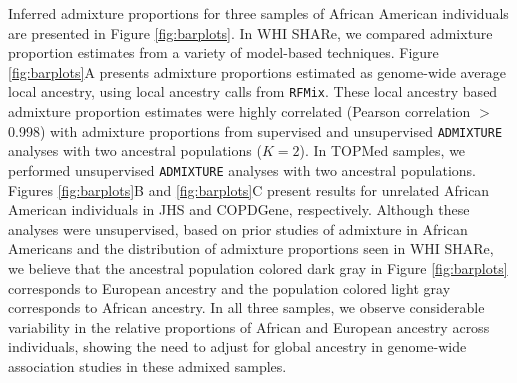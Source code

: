 \documentclass[12pt]{article}
\begin{document}
Inferred admixture proportions for three samples of African American individuals are presented in Figure \ref{fig:barplots}. 
In WHI SHARe, we compared admixture proportion estimates from a variety of model-based techniques. 
Figure \ref{fig:barplots}A presents admixture proportions estimated as genome-wide average local ancestry, using local ancestry calls from \texttt{RFMix}. 
These local ancestry based admixture proportion estimates were highly correlated (Pearson correlation $>$ 0.998) with admixture proportions from supervised and unsupervised \texttt{ADMIXTURE} analyses with two ancestral populations ($K = 2$). 
In TOPMed samples, we performed unsupervised \texttt{ADMIXTURE} analyses with two ancestral populations. 
Figures \ref{fig:barplots}B and \ref{fig:barplots}C present results for unrelated African American individuals in JHS and COPDGene, respectively.
Although these analyses were unsupervised, based on prior studies of admixture in African Americans and the distribution of admixture proportions seen in WHI SHARe, we believe that the ancestral population colored dark gray in Figure \ref{fig:barplots} corresponds to European ancestry and the population colored light gray corresponds to African ancestry.
In all three samples, we observe considerable variability in the relative proportions of African and European ancestry across individuals, showing the need to adjust for global ancestry in genome-wide association studies in these admixed samples. 

\end{document}
